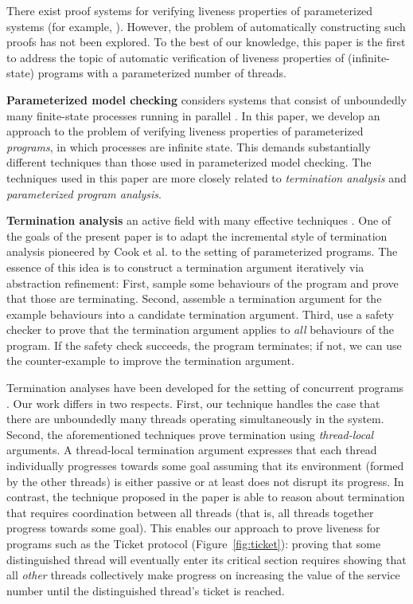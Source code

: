 \documentclass[9pt,nocopyrightspace]{sigplanconf}
\theoremstyle{definition}
\begin{document}
There exist proof systems for verifying liveness properties of parameterized
systems (for example, \cite{Sanchez2014}).  However, the problem of
automatically constructing such proofs has not been explored.  To the best of
our knowledge, this paper is the first to address the topic of automatic
verification of liveness properties of (infinite-state) programs with a
parameterized number of threads.


\textbf{Parameterized model checking} considers systems that consist of
unboundedly many finite-state processes running in parallel
\cite{Abdulla2010,journals/sttt/AbdullaJNdS12,PnueliRZ01,vmcai/FangPPZ04,tacas/FPPZ04,journals/corr/Durand-Gasselin15}.
In this paper, we develop an approach to the problem of verifying liveness
properties of parameterized \emph{programs}, in which processes are infinite
state.  This demands substantially different techniques than those used in
parameterized model checking.  The techniques used in this paper are more
closely related to \emph{termination analysis} and \emph{parameterized program
  analysis}.



\textbf{Termination analysis} an active field with many effective techniques
\cite{pldi/CookPR06,conf/tacas/CookSZ13,popl/CousotC12,conf/cav/HeizmannHP14,cav/LeeWY12,conf/tacas/Urban15}.
One of the goals of the present paper is to adapt the incremental style of
termination analysis pioneered by Cook et al. \cite{Cook2005,pldi/CookPR06} to the setting of parameterized
programs.  The essence of this idea is to construct a
termination argument iteratively via abstraction refinement: First, sample
some behaviours of the program and prove that those are terminating.  Second,
assemble a termination argument for the example behaviours into a candidate
termination argument.  Third, use a safety checker to prove that the
termination argument applies to \emph{all} behaviours of the program.  If the
safety check succeeds, the program terminates; if not, we can use the
counter-example to improve the termination argument.

Termination analyses have been developed for the setting of concurrent
programs \cite{Cook2007,Popeea2012,KetemaDonaldson2014}.  Our work differs in
two respects.  First, our technique handles the case that there are
unboundedly many threads operating simultaneously in the system.  Second, the
aforementioned techniques prove termination using \emph{thread-local}
arguments.  A thread-local termination argument expresses that each thread individually progresses towards some goal assuming that its
environment (formed by the other threads) is either passive or at least does
not disrupt its progress.  In contrast, the technique proposed in the
paper is able to reason about termination that requires coordination between all
threads (that is, all threads together progress towards some goal).  This
enables our approach to prove liveness for programs such as the Ticket
protocol (Figure~\ref{fig:ticket}): proving that some distinguished thread
will eventually enter its critical section requires showing that all
\emph{other} threads collectively make progress on increasing the value of the
service number until the distinguished thread's ticket is reached.
\end{document}
